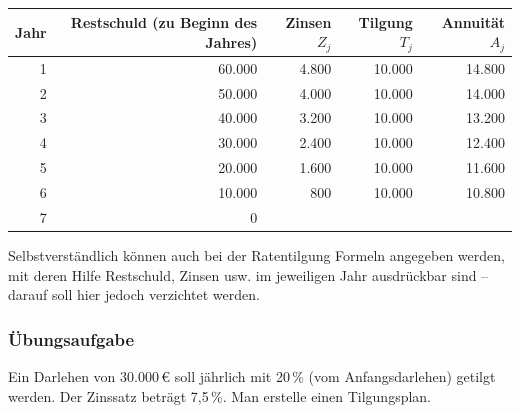\begin{center}
  \centering
  \begin{tabular}{rrrrr}
    \hline
    Jahr & Restschuld (zu Beginn des Jahres) & Zinsen $Z_j$ & Tilgung $T_j$ & Annuität $A_j$\\
    \hline
    1 & 60.000 & 4.800 & 10.000 & 14.800\\
    2 & 50.000 & 4.000 & 10.000 & 14.000\\
    3 & 40.000 & 3.200 & 10.000 & 13.200\\
    4 & 30.000 & 2.400 & 10.000 & 12.400\\
    5 & 20.000 & 1.600 & 10.000 & 11.600\\
    6 & 10.000 & 800 & 10.000 & 10.800\\
    7 & 0 & & & \\
    \hline
  \end{tabular}
\end{center}
\beispielende

Selbstverständlich können auch bei der Ratentilgung Formeln angegeben werden, mit deren Hilfe Restschuld, Zinsen usw. im jeweiligen Jahr ausdrückbar sind -- darauf soll hier jedoch verzichtet werden.

\subsubsection{Übungsaufgabe}

\begin{graukasten}
  Ein Darlehen von 30.000\,€ soll jährlich mit 20\,\% (vom Anfangsdarlehen) getilgt werden. Der Zinssatz beträgt 7{,}5\,\%. Man erstelle einen Tilgungsplan.
\end{graukasten}
